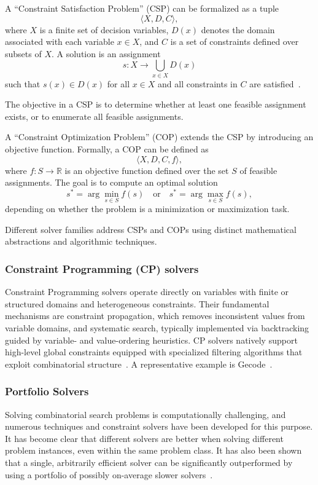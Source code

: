 \documentclass[../../main]{subfiles}
\begin{document}
A ``Constraint Satisfaction Problem'' (CSP) can be formalized as a tuple
\[
\langle X, D, C \rangle,
\]
where \(X\) is a finite set of decision variables, \(D(x)\) denotes the domain associated with each variable \(x \in X\), and \(C\) is a set of constraints defined over subsets of \(X\). A solution is an assignment
\[
s : X \rightarrow \bigcup_{x \in X} D(x)
\]
such that \(s(x) \in D(x)\) for all \(x \in X\) and all constraints in \(C\) are satisfied~\cite{SeaPearl}.

The objective in a CSP is to determine whether at least one feasible assignment exists, or to enumerate all feasible assignments.

A ``Constraint Optimization Problem'' (COP) extends the CSP by introducing an objective function. Formally, a COP can be defined as
\[
\langle X, D, C, f \rangle,
\]
where \(f : S \rightarrow \mathbb{R}\) is an objective function defined over the set \(S\) of feasible assignments. The goal is to compute an optimal solution
\[
s^* = \arg\min_{s \in S} f(s)
\quad \text{or} \quad
s^* = \arg\max_{s \in S} f(s),
\]
depending on whether the problem is a minimization or maximization task.

Different solver families address CSPs and COPs using distinct mathematical abstractions and algorithmic techniques.

\subsubsection{Constraint Programming (CP) solvers}

Constraint Programming solvers operate directly on variables with finite or structured domains and heterogeneous constraints. Their fundamental mechanisms are constraint propagation, which removes inconsistent values from variable domains, and systematic search, typically implemented via backtracking guided by variable- and value-ordering heuristics. CP solvers natively support high-level global constraints equipped with specialized filtering algorithms that exploit combinatorial structure~\cite{CPvsMILPsolvers}. A representative example is Gecode~\cite{Gecode}.

\subsubsection{Portfolio Solvers}
Solving combinatorial search problems is computationally challenging, and numerous techniques and constraint solvers have been developed for this purpose. It has become clear that different solvers are better when solving different problem instances, even within the same problem class. It has also been shown that a single, arbitrarily efficient solver can be significantly outperformed by using a portfolio of possibly on-average slower solvers~\cite{PortfolioSolvers}.
\end{document}
